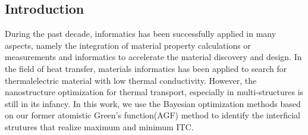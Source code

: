 \subsection{Introduction}
During the past decade, informatics has been successfully applied in many aspects\cite{rajan2015materials,agrawal2016perspective}, namely the integration of
material property calculations or measurements and informatics to accelerate the material discovery and design. In the field of heat transfer, materials informatics has been applied to search for thermalelectric material with low thermal conductivity\cite{carrete2014finding}. However, the nanostructure optimization for thermal transport, especially in multi-structures is still in its infancy. In this work, we use the Bayesian optimization methods based on our former atomistic Green's function(AGF) method to identify the interficial strutures that realize maximum and minimum ITC.

